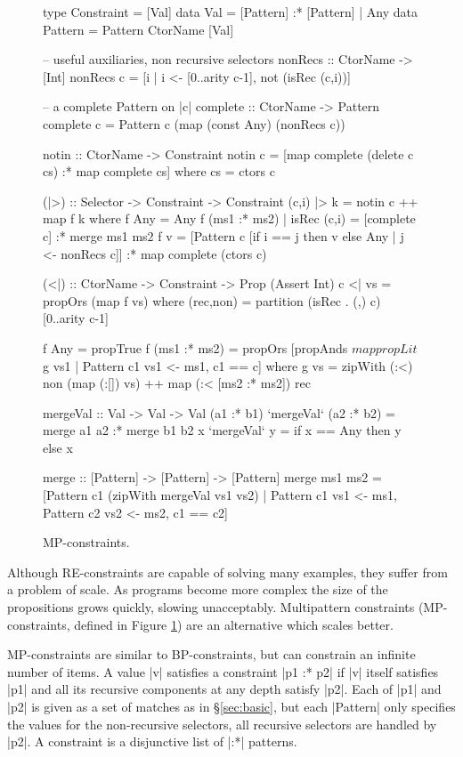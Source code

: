 \begin{figure}
\begin{code}
type Constraint  =  [Val]
data Val         =  [Pattern] :* [Pattern] |  Any
data Pattern     =  Pattern CtorName [Val]

-- useful auxiliaries, non recursive selectors
nonRecs :: CtorName -> [Int]
nonRecs c = [i | i <- [0..arity c-1], not (isRec (c,i))]

-- a complete Pattern on |c|
complete :: CtorName -> Pattern
complete c = Pattern c (map (const Any) (nonRecs c))

notin :: CtorName -> Constraint
notin c = [map complete (delete c cs) :* map complete cs]
    where cs = ctors c

(|>) :: Selector -> Constraint -> Constraint
(c,i) |> k = notin c ++ map f k
    where
    f Any = Any
    f (ms1 :* ms2) | isRec (c,i) = [complete c] :* merge ms1 ms2
    f v =  [Pattern c [if i == j then v else Any | j <- nonRecs c]]
           :* map complete (ctors c)

(<|) :: CtorName -> Constraint -> Prop (Assert Int)
c <| vs = propOrs (map f vs)
    where
    (rec,non) = partition (isRec . (,) c) [0..arity c-1]

    f Any = propTrue
    f (ms1 :* ms2) =  propOrs  [propAnds $ map propLit $ g vs1
                               | Pattern c1 vs1 <- ms1, c1 == c]
        where g vs =  zipWith (:<) non (map (:[]) vs) ++
                      map (:< [ms2 :* ms2]) rec

mergeVal :: Val -> Val -> Val
(a1 :* b1)  `mergeVal`  (a2 :* b2)  = merge a1 a2 :* merge b1 b2
x           `mergeVal`  y           = if x == Any then y else x

merge :: [Pattern] -> [Pattern] -> [Pattern]
merge  ms1 ms2 = [Pattern c1 (zipWith mergeVal vs1 vs2) |
       Pattern c1 vs1 <- ms1, Pattern c2 vs2 <- ms2, c1 == c2]
\end{code}
\caption{MP-constraints.}
\label{fig:enumeration}
\figureend
\end{figure}

Although RE-constraints are capable of solving many examples, they suffer from a problem of scale. As programs become more complex the size of the propositions grows quickly, slowing \catch{} unacceptably. Multipattern constraints (MP-constraints, defined in Figure \ref{fig:enumeration}) are an alternative which scales better.

MP-constraints are similar to BP-constraints, but can constrain an infinite number of items. A value |v| satisfies a constraint |p1 :* p2| if |v| itself satisfies |p1| and all its recursive components at any depth satisfy |p2|. Each of |p1| and |p2| is given as a set of matches as in \S\ref{sec:basic}, but each |Pattern| only specifies the values for the non-recursive selectors, all recursive selectors are handled by |p2|. A constraint is a disjunctive list of |:*| patterns.

